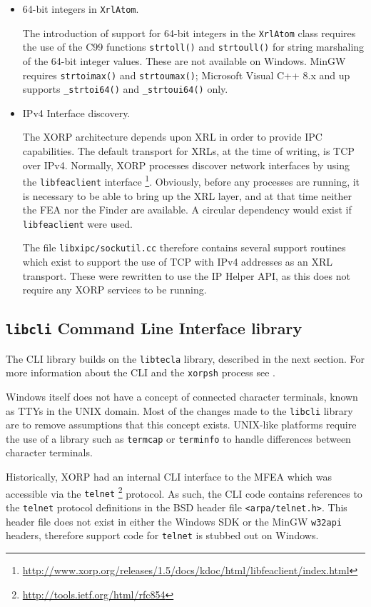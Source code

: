\documentclass[11pt]{article}
\begin{document}
{\begin{itemize}
 \item 64-bit integers in {\tt XrlAtom}.

The introduction of support for 64-bit integers in the {\tt XrlAtom} class
requires the use of the C99 functions {\tt strtoll()} and {\tt strtoull()}
for string marshaling of the 64-bit integer values.
These are not available on Windows.
MinGW requires {\tt strtoimax()} and {\tt strtoumax()};
Microsoft Visual C++ 8.x and up supports {\tt \_strtoi64()}
and {\tt \_strtoui64()} only.

 \item IPv4 Interface discovery.

The XORP architecture depends upon XRL in order to provide IPC capabilities.
The default transport for XRLs, at the time of writing, is TCP over IPv4.
Normally, XORP processes discover network interfaces by using the
{\tt libfeaclient} interface
\footnote{\url{http://www.xorp.org/releases/1.5/docs/kdoc/html/libfeaclient/index.html}}.
Obviously, before any processes are running, it is necessary to be able
to bring up the XRL layer, and at that time neither the FEA nor the
Finder are available. A circular dependency would exist if {\tt libfeaclient}
were used.

The file {\tt libxipc/sockutil.cc} therefore contains several support
routines which exist to
support the use of TCP with IPv4 addresses as an XRL transport. These
were rewritten to use the IP Helper API, as this does not require
any XORP services to be running.

\end{itemize}


\subsection{{\tt libcli} Command Line Interface library}

The CLI library builds on the {\tt libtecla} library, described in the next section.
For more information about the CLI and the {\tt xorpsh} process see
\cite{xorp:rtrmgr}.

Windows itself does not have a concept of connected
character terminals, known as TTYs in the UNIX domain.
Most of the changes made to the {\tt libcli} library
are to remove assumptions that this concept exists.
UNIX-like platforms require the use of
a library such as {\tt termcap} or {\tt terminfo}
to handle differences
between character terminals.

Historically, XORP had an internal CLI interface to the MFEA
which was accessible via the {\tt telnet}
\footnote{\url{http://tools.ietf.org/html/rfc854}}
protocol.
As such, the CLI code contains references to the {\tt telnet} protocol definitions
in the BSD header file {\tt <arpa/telnet.h>}. This header file does not exist
in either the Windows SDK or the MinGW {\tt w32api} headers, therefore
support code for {\tt telnet} is stubbed out on Windows.

}
\end{document}
